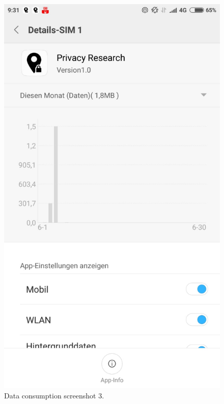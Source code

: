 \begin{figure}
	\centering
	\begin{minipage}{.45\textwidth}
		\begin{center}
		\includegraphics[width=\textwidth]{data/data-usage/data-usage2-2.jpeg}
		\caption{Data consumption screenshot 3.}
		\end{center}
	\end{minipage}
	\hfill
	\begin{minipage}{.45\textwidth}

\end{minipage}
\end{figure}
